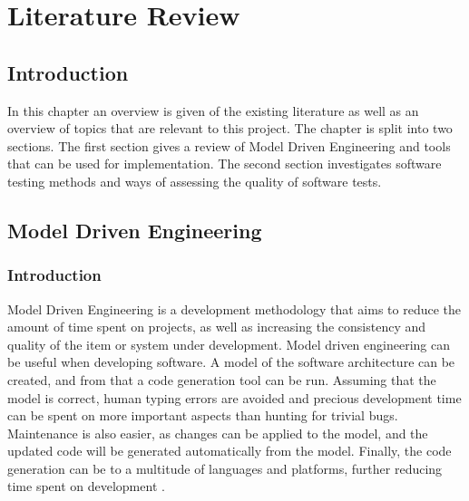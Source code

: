 \chapter{Literature Review}
\label{chap:LitReview}

\section{Introduction}
In this chapter an overview is given of the existing literature as well as an overview of topics that are relevant to this project. The chapter is split into two sections. The first section gives a review of Model Driven Engineering and tools that can be used for implementation. The second section investigates software testing methods and ways of assessing the quality of software tests.

\section{Model Driven Engineering}

\subsection{Introduction}
Model Driven Engineering is a development methodology that aims to reduce the amount of time spent on projects, as well as increasing the consistency and quality of the item or system under development. Model driven engineering can be useful when developing software. A model of the software architecture can be created, and from that a code generation tool can be run. Assuming that the model is correct, human typing errors are avoided and precious development time can be spent on more important aspects than hunting for trivial bugs. Maintenance is also easier, as changes can be applied to the model, and the updated code will be generated automatically from the model. Finally, the code generation can be to a multitude of languages and platforms, further reducing time spent on development \cite{mdseLano}.


